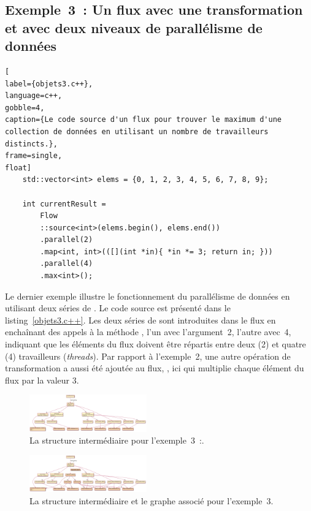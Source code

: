 \subsection{Exemple~3~: Un flux avec une transformation et avec deux niveaux de parallélisme de données}


\begin{lstlisting}[
label={objets3.c++},
language=c++,
gobble=4,
caption={Le code source d'un flux pour trouver le maximum d'une collection de données en utilisant un nombre de travailleurs distincts.},
frame=single,
float]
    std::vector<int> elems = {0, 1, 2, 3, 4, 5, 6, 7, 8, 9};

    int currentResult =
        Flow
        ::source<int>(elems.begin(), elems.end())
        .parallel(2)
        .map<int, int>(([](int *in){ *in *= 3; return in; }))
        .parallel(4)
        .max<int>();
\end{lstlisting}

Le dernier exemple illustre le fonctionnement du parallélisme de données en utilisant deux s\'eries de . Le code source est présenté dans le listing~\ref{objets3.c++}. Les deux s\'eries de  sont introduites dans le flux en encha\^inant des appels à la m\'ethode , l'un avec l'argument~2, l'autre avec~4, indiquant que les \'el\'ements du flux doivent être r\'epartis entre deux (2) et quatre (4) travailleurs (\emph{threads}). Par rapport à l'exemple~2, une autre opération de transformation a aussi \'et\'e ajout\'ee au flux, , ici qui multiplie chaque \'el\'ement du flux par la valeur 3.



\begin{figure}
\centering
         \includegraphics[angle=90,width=0.45\textwidth]{Figures/objets3-ppff.pdf}
      \caption[La structure interm\'ediaire  pour l'exemple~3.]{La structure interm\'ediaire  pour 
         l'exemple~3~:.}
       \label{objets3-ppff.fig}
\end{figure}       


\begin{figure}
\centering
         \includegraphics[angle=90,width=0.45\textwidth]{Figures/objets3-ff.pdf}
      \caption{La structure interm\'ediaire  et le graphe  associ\'e pour l'exemple~3.}
       \label{objets3-ff.fig}
\end{figure}



